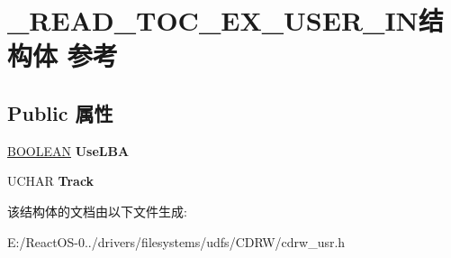 \hypertarget{struct___r_e_a_d___t_o_c___e_x___u_s_e_r___i_n}{}\section{\+\_\+\+R\+E\+A\+D\+\_\+\+T\+O\+C\+\_\+\+E\+X\+\_\+\+U\+S\+E\+R\+\_\+\+I\+N结构体 参考}
\label{struct___r_e_a_d___t_o_c___e_x___u_s_e_r___i_n}
\subsection*{Public 属性}
\begin{DoxyCompactItemize}
\item 
\mbox{\label{struct___r_e_a_d___t_o_c___e_x___u_s_e_r___i_n_a1efa6ba97ce6ac80c2893d74d7b2ad37}} 
\hyperlink{_processor_bind_8h_a112e3146cb38b6ee95e64d85842e380a}{B\+O\+O\+L\+E\+AN} {\bfseries Use\+L\+BA}
\item 
\mbox{\label{struct___r_e_a_d___t_o_c___e_x___u_s_e_r___i_n_a88a9ac606599f9cb89bdadd87a41d45a}} 
U\+C\+H\+AR {\bfseries Track}
\end{DoxyCompactItemize}


该结构体的文档由以下文件生成\+:\begin{DoxyCompactItemize}
\item 
E\+:/\+React\+O\+S-\/0../drivers/filesystems/udfs/\+C\+D\+R\+W/cdrw\+\_\+usr.\+h\end{DoxyCompactItemize}
